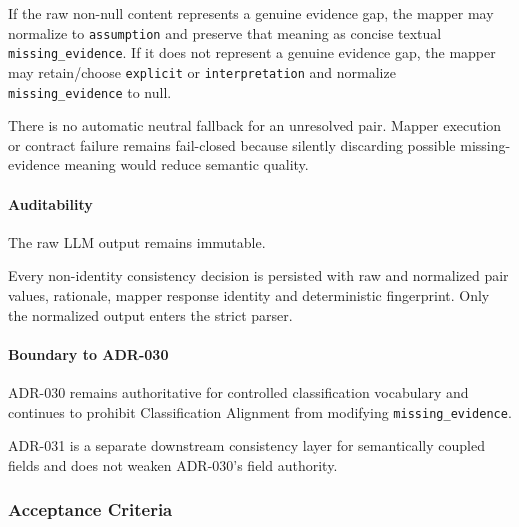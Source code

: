 If the raw non-null content represents a genuine evidence gap, the mapper may normalize to \texttt{assumption} and preserve that meaning as concise textual \texttt{missing\_evidence}. If it does not represent a genuine evidence gap, the mapper may retain/choose \texttt{explicit} or \texttt{interpretation} and normalize \texttt{missing\_evidence} to null.

There is no automatic neutral fallback for an unresolved pair. Mapper execution or contract failure remains fail-closed because silently discarding possible missing-evidence meaning would reduce semantic quality.

\hypertarget{auditability}{%
\paragraph{Auditability}\label{auditability}}

The raw LLM output remains immutable.

Every non-identity consistency decision is persisted with raw and normalized pair values, rationale, mapper response identity and deterministic fingerprint. Only the normalized output enters the strict parser.

\hypertarget{boundary-to-adr-030}{%
\paragraph{Boundary to ADR-030}\label{boundary-to-adr-030}}

ADR-030 remains authoritative for controlled classification vocabulary and continues to prohibit Classification Alignment from modifying \texttt{missing\_evidence}.

ADR-031 is a separate downstream consistency layer for semantically coupled fields and does not weaken ADR-030's field authority.

\hypertarget{acceptance-criteria-4}{%
\subsubsection{Acceptance Criteria}\label{acceptance-criteria-4}}


